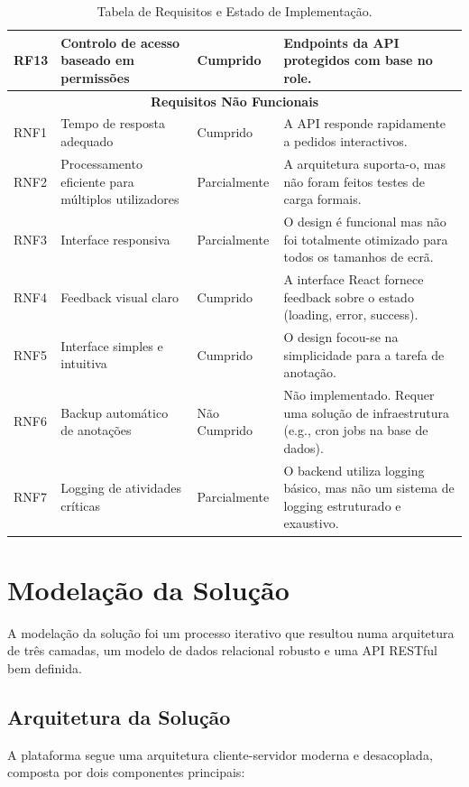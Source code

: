 \begin{table}[h!]
\begin{tabular}{|p{}|p{}|p{}|p{}|}
        RF13 & Controlo de acesso baseado em permissões & Cumprido & Endpoints da API protegidos com base no role. \\
        \hline
        \multicolumn{4}{|c|}{\textbf{Requisitos Não Funcionais}} \\
        \hline
        RNF1 & Tempo de resposta adequado & Cumprido & A API responde rapidamente a pedidos interactivos. \\
        \hline
        RNF2 & Processamento eficiente para múltiplos utilizadores & Parcialmente & A arquitetura suporta-o, mas não foram feitos testes de carga formais. \\
        \hline
        RNF3 & Interface responsiva & Parcialmente & O design é funcional mas não foi totalmente otimizado para todos os tamanhos de ecrã. \\
        \hline
        RNF4 & Feedback visual claro & Cumprido & A interface React fornece feedback sobre o estado (loading, error, success). \\
        \hline
        RNF5 & Interface simples e intuitiva & Cumprido & O design focou-se na simplicidade para a tarefa de anotação. \\
        \hline
        RNF6 & Backup automático de anotações & Não Cumprido & Não implementado. Requer uma solução de infraestrutura (e.g., cron jobs na base de dados). \\
        \hline
        RNF7 & Logging de atividades críticas & Parcialmente & O backend utiliza logging básico, mas não um sistema de logging estruturado e exaustivo. \\
        \hline
    \end{tabular}
    \caption{Tabela de Requisitos e Estado de Implementação.}
    \label{tab:requisitos}
\end{table}

\section{Modelação da Solução}

A modelação da solução foi um processo iterativo que resultou numa arquitetura de três camadas, um modelo de dados relacional robusto e uma API RESTful bem definida.

\subsection{Arquitetura da Solução}

A plataforma segue uma arquitetura cliente-servidor moderna e desacoplada, composta por dois componentes principais:

